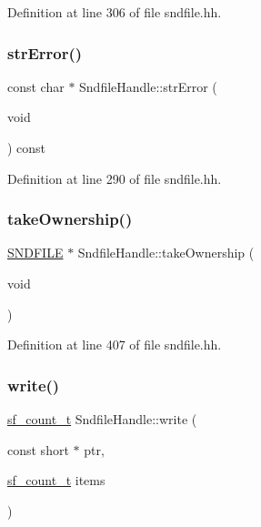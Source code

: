 Definition at line 306 of file sndfile.\+hh.

\mbox{\label{class_sndfile_handle_a1405842e7e672b9789075bf8a4983a13}} 
\subsubsection{\texorpdfstring{strError()}{strError()}}
{\footnotesize\ttfamily const char $\ast$ Sndfile\+Handle\+::str\+Error (\begin{DoxyParamCaption}\item[{void}]{ }\end{DoxyParamCaption}) const\hspace{0.3cm}{\ttfamily [inline]}}



Definition at line 290 of file sndfile.\+hh.

\mbox{\label{class_sndfile_handle_a9461ef4669a8df24945e846fb28875b2}} 
\subsubsection{\texorpdfstring{takeOwnership()}{takeOwnership()}}
{\footnotesize\ttfamily \mbox{\hyperlink{sndfile_8h_ac14209bc83d532b06a8cdf9ade6d544a}{S\+N\+D\+F\+I\+LE}} $\ast$ Sndfile\+Handle\+::take\+Ownership (\begin{DoxyParamCaption}\item[{void}]{ }\end{DoxyParamCaption})\hspace{0.3cm}{\ttfamily [inline]}}



Definition at line 407 of file sndfile.\+hh.

\mbox{\label{class_sndfile_handle_ae7aac54beecd7eb08d080f4e6cd171f4}} 
\subsubsection{\texorpdfstring{write()}{write()}\hspace{0.1cm}{\footnotesize\ttfamily [1/4]}}
{\footnotesize\ttfamily \mbox{\hyperlink{sndfile_8h_af2b12fded74bc949f1f1f392a2af4892}{sf\+\_\+count\+\_\+t}} Sndfile\+Handle\+::write (\begin{DoxyParamCaption}\item[{const short $\ast$}]{ptr,  }\item[{\mbox{\hyperlink{sndfile_8h_af2b12fded74bc949f1f1f392a2af4892}{sf\+\_\+count\+\_\+t}}}]{items }\end{DoxyParamCaption})\hspace{0.3cm}{\ttfamily [inline]}}



